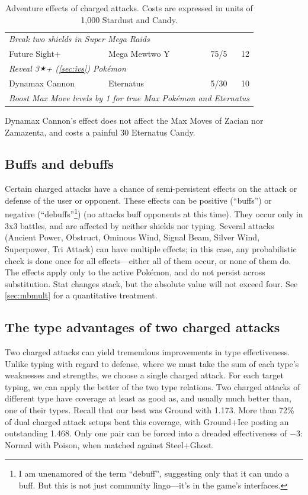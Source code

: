 \begin{table}
\begin{tabular}{llrr}
  \multicolumn{4}{l}{\textit{Break two shields in Super Mega Raids}}\\
Future Sight+ & Mega Mewtwo Y & 75/5 & 12 \\
  \multicolumn{4}{l}{\textit{Reveal 3🟉+ (\autoref{sec:ivs}) Pokémon}}\\
Dynamax Cannon & Eternatus & 5/30 & 10\\
  \multicolumn{4}{l}{\textit{Boost Max Move levels by 1 for true Max Pokémon and Eternatus}}\\
\end{tabular}
\caption[Adventure effects of charged attacks]{Adventure effects of charged attacks. Costs are expressed in units of 1,000 Stardust and Candy.\label{table:adveffects}}
\end{table}
Dynamax Cannon's effect does not affect the Max Moves of Zacian nor Zamazenta,
 and costs a painful 30 Eternatus Candy.

\subsection{Buffs and debuffs\label{sec:buffs}}
Certain charged attacks have a chance of semi-persistent effects on the
  attack or defense of the user or opponent.
These effects can be positive (``buffs'') or negative (``debuffs''\footnote{I am unenamored of the term ``debuff'',
  suggesting only that it can undo a buff. But this is not just community lingo---it's in the
  game's interfaces.}) (no attacks buff opponents at this time).
They occur only in 3x3 battles, and are affected by neither shields nor typing.
Several attacks (Ancient Power, Obstruct, Ominous Wind, Signal Beam, Silver
  Wind, Superpower, Tri Attack) can have multiple effects; in this case, any
  probabilistic check is done once for all effects---either all of them
  occur, or none of them do.
The effects apply only to the active Pokémon, and do not persist across substitution.
Stat changes stack, but the absolute value will not exceed four.
See \autoref{sec:mbmult} for a quantitative treatment.

\subsection{The type advantages of two charged attacks\label{sec:dualcharged}}
Two charged attacks can yield tremendous improvements in type effectiveness.
Unlike typing with regard to defense, where we must take the sum of each type's
 weaknesses and strengths, we choose a single charged attack.
For each target typing, we can apply the better of the two type relations.
Two charged attacks of different type have coverage at least as good as,
  and usually much better than, one of their types.
Recall that our best \ARA{} was Ground with 1.173.
More than 72\% of dual charged attack setups beat this coverage,
 with Ground+Ice posting an outstanding 1.468.
Only one pair can be forced into a dreaded effectiveness of −3:
 Normal with Poison, when matched against Steel+Ghost.


